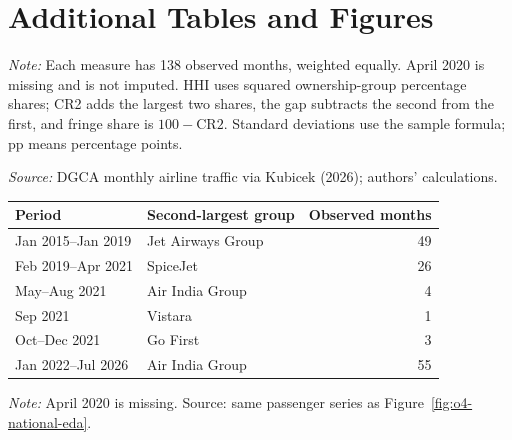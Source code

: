 \documentclass[12pt,a4paper]{article}
\begin{document}
\section{Additional Tables and Figures}
\label{app:o4-national-summary}
\begin{minipage}{\linewidth}
\captionsetup{font=small,labelfont=bf,justification=raggedright,singlelinecheck=false,hypcap=false}
\label{tab:o4-national-summary}
\centering
{\small{}\par}
\vspace{4pt}
{\footnotesize{}\raggedright\textit{Note:} Each measure has 138 observed months, weighted equally. April 2020 is missing and is not imputed. HHI uses squared ownership-group percentage shares; CR2 adds the largest two shares, the gap subtracts the second from the first, and fringe share is $100-\mathrm{CR2}$. Standard deviations use the sample formula; pp means percentage points.\par
\textit{Source:} DGCA monthly airline traffic via Kubicek (2026); authors' calculations.\par}
\end{minipage}


\medskip
\begin{minipage}{\linewidth}
\captionsetup{font=small,labelfont=bf,justification=raggedright,singlelinecheck=false,hypcap=false}
\label{tab:o4-leading-pairs}
\centering
{\small{}
\begin{tabular}{@{}llr@{}}
\toprule
Period & Second-largest group & Observed months \\
\midrule
Jan 2015--Jan 2019 & Jet Airways Group & 49 \\
Feb 2019--Apr 2021 & SpiceJet & 26 \\
May--Aug 2021 & Air India Group & 4 \\
Sep 2021 & Vistara & 1 \\
Oct--Dec 2021 & Go First & 3 \\
Jan 2022--Jul 2026 & Air India Group & 55 \\
\bottomrule
\end{tabular}\par}
\vspace{3pt}
{\footnotesize{}\raggedright\textit{Note:} April 2020 is missing. Source: same passenger series as Figure~\ref{fig:o4-national-eda}.\par}
\end{minipage}
\end{document}
